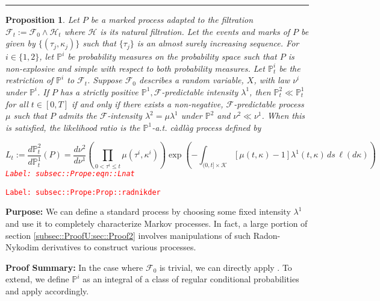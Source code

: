 \documentclass[12pt]{article}
\newcommand{\mb}{\mathbb}
\newcommand{\mc}{\mathcal}
\newcommand{\tr}{\textcolor{red}}
\newcommand{\labe}[1]{\tr{\texttt{Label: #1}}}
\newcommand{\purpose}{\textbf{Purpose: }}
\newcommand{\pfsum}{\textbf{Proof Summary: }}
\newcommand{\lin}{\rule{\linewidth}{0.4 pt}}
\newcommand{\pr}{\mb{P}}							%
\renewcommand{\t}{t}							%
\newcommand{\F}{\mc{F}}							%
\newcommand{\FH}{\mc{H}}						%
\newcommand{\X}{X}								%
\newcommand{\ts}[1]{_{#1}}						%
\newcommand{\rate}{\lambda}						%
\newcommand{\indx}[1]{_{#1}}					%
\newcommand{\m}{\mu}							%
\newcommand{\mm}{\nu}							%
\newcommand{\me}[1]{^{#1}}						%
\newcommand{\rt}{\tau}							%
\renewcommand{\mark}{\kappa}					%
\newcommand{\rp}{P}								%
\newcommand{\mspce}{\mc{K}}						%
\newtheorem{prop}[thms]{Proposition}
\begin{document}
\lin

\begin{prop}
Let \(\rp\) be a marked process adapted to the filtration \(\F\ts{\t} := \F\ts{0}\wedge \FH\ts{\t}\) where \(\FH\) is its natural filtration. Let the events and marks of \(\rp\) be given by \(\{(\rt\indx{j},\mark\indx{j})\}\) such that \(\{\rt\indx{j}\}\) is an almost surely increasing sequence. For \(i \in \{1,2\}\), let \(\pr\me{i}\) be probability measures on the probability space such that \(\rp\) is non-explosive and simple with respect to both probability measures. Let \(\pr\me{i}\ts{\t}\) be the restriction of \(\pr\me{i}\) to \(\F\ts{\t}\). Suppose \(\F\ts{0}\) describes a random variable, \(\X\), with law \(\mm^i\) under \(\pr\me{i}\). If \(\rp\) has a strictly positive \(\pr\me{1},\F\)-predictable intensity \(\rate^1\), then \(\pr\me{2}\ts{\t} \ll \pr\me{1}\ts{\t}\) for all \(\t \in [0,T]\) if and only if there exists a non-negative, \(\F\)-predictable process \(\m\) such that \(\rp\) admits the \(\F\)-intensity \(\rate^2 = \m\rate^1\) under \(\pr\me{2}\) and \(\mm^2 \ll \mm^1\). When this is satisfied, the likelihood ratio is the \(\pr\me{1}\)-a.t. c\`adl\`ag process defined by 

\begin{equation}
L_\t:= \frac{d\pr\me{2}\ts{\t}}{d\pr\me{1}\ts{\t}}(\rp) = \frac{d\mm^2}{d\mm^1}\left(\prod_{0<\rt^i\leq \t} \m(\rt^i,\mark^i)\right)\exp\left(-\int_{(0,\t]\times \mspce}[\m(\t,\mark) - 1]\rate^1(\t,\mark)\,ds\,\ell(d\mark)\right)
\label{subsec::Prope:eqn::Lnat}
\end{equation}
\labe{subsec::Prope:eqn::Lnat}
\label{subsec::Prope:Prop::radnikder}
\end{prop}
\labe{subsec::Prope:Prop::radnikder}

\purpose We can define a standard process by choosing some fixed intensity \(\rate^1\) and use it to completely characterize Markov processes. In fact, a large portion of section \ref{subsec::ProofU:sec::Proof2} involves manipulations of such Radon-Nykodim derivatives to construct various processes.

\pfsum In the case where \(\F\ts{0}\) is trivial, we can directly apply \cite[Theorem 14.4.I]{DalVer08}. To extend, we define \(\pr\me{i}\) as an integral of a class of regular conditional probabilities and apply \cite[Theorem 14.4.I]{DalVer08} accordingly.
\end{document}
